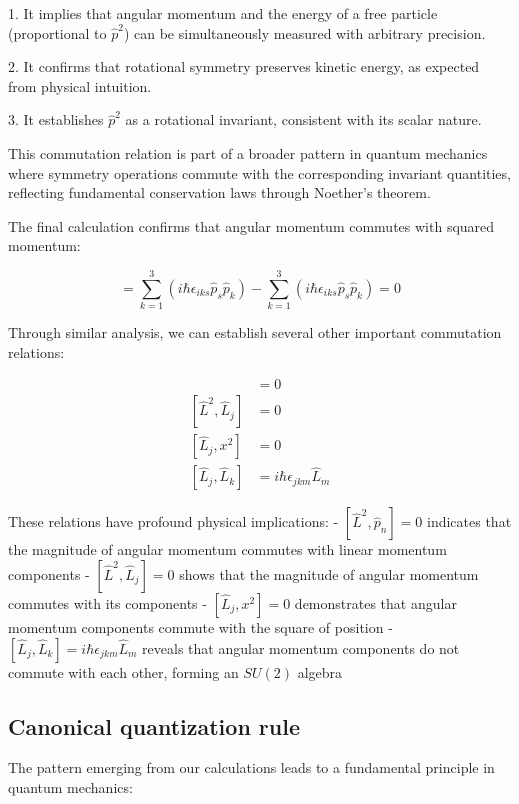 \documentclass[italian]{HKNdocument}
\begin{document}
1. It implies that angular momentum and the energy of a free particle (proportional to $\hat{p}^2$) can be simultaneously measured with arbitrary precision.

2. It confirms that rotational symmetry preserves kinetic energy, as expected from physical intuition.

3. It establishes $\hat{p}^2$ as a rotational invariant, consistent with its scalar nature.

This commutation relation is part of a broader pattern in quantum mechanics where symmetry operations commute with the corresponding invariant quantities, reflecting fundamental conservation laws through Noether's theorem.


The final calculation confirms that angular momentum commutes with squared momentum:

\begin{equation}
[\hat{L}_i, \hat{p}^2] = \sum_{k=1}^{3}(i\hbar\epsilon_{iks}\hat{p}_s\hat{p}_k) - \sum_{k=1}^{3}(i\hbar\epsilon_{iks}\hat{p}_s\hat{p}_k) = 0
\end{equation}

Through similar analysis, we can establish several other important commutation relations:

\begin{align}
[\hat{L}^2, \hat{p}_n] &= 0 \\
[\hat{L}^2, \hat{L}_j] &= 0 \\
[\hat{L}_j, x^2] &= 0  \\
[\hat{L}_j, \hat{L}_k] &= i\hbar\epsilon_{jkm}\hat{L}_m
\end{align}

These relations have profound physical implications:
- $[\hat{L}^2, \hat{p}_n] = 0$ indicates that the magnitude of angular momentum commutes with linear momentum components
- $[\hat{L}^2, \hat{L}_j] = 0$ shows that the magnitude of angular momentum commutes with its components
- $[\hat{L}_j, x^2] = 0$ demonstrates that angular momentum components commute with the square of position
- $[\hat{L}_j, \hat{L}_k] = i\hbar\epsilon_{jkm}\hat{L}_m$ reveals that angular momentum components do not commute with each other, forming an $SU(2)$ algebra

\subsection{Canonical quantization rule}

The pattern emerging from our calculations leads to a fundamental principle in quantum mechanics:
\end{document}
